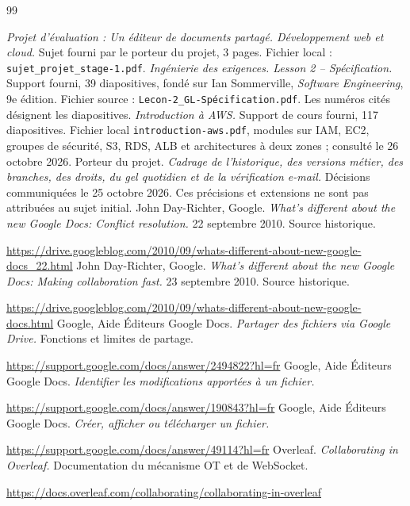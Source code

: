 \begingroup
\small
\begin{thebibliography}{99}
\setlength{\itemsep}{0pt}
\setlength{\parskip}{0pt}
 \emph{Projet d'évaluation : Un éditeur de documents partagé. Développement web et cloud.} Sujet fourni par le porteur du projet, 3 pages. Fichier local : \texttt{sujet\_projet\_stage-1.pdf}.
 \emph{Ingénierie des exigences. Lesson 2 -- Spécification.} Support fourni, 39 diapositives, fondé sur Ian Sommerville, \emph{Software Engineering}, 9e édition. Fichier source : \texttt{Lecon-2\_GL-Spécification.pdf}. Les numéros cités désignent les diapositives.
 \emph{Introduction à AWS.} Support de cours fourni, 117 diapositives. Fichier local \texttt{introduction-aws.pdf}, modules sur IAM, EC2, groupes de sécurité, S3, RDS, ALB et architectures à deux zones ; consulté le 26 octobre 2026.
 Porteur du projet. \emph{Cadrage de l'historique, des versions métier, des branches, des droits, du gel quotidien et de la vérification e-mail.} Décisions communiquées le 25 octobre 2026. Ces précisions et extensions ne sont pas attribuées au sujet initial.
 John Day-Richter, Google. \emph{What's different about the new Google Docs: Conflict resolution.} 22 septembre 2010. Source historique.\par\url{https://drive.googleblog.com/2010/09/whats-different-about-new-google-docs_22.html}
 John Day-Richter, Google. \emph{What's different about the new Google Docs: Making collaboration fast.} 23 septembre 2010. Source historique.\par\url{https://drive.googleblog.com/2010/09/whats-different-about-new-google-docs.html}
 Google, Aide Éditeurs Google Docs. \emph{Partager des fichiers via Google Drive.} Fonctions et limites de partage.\par\url{https://support.google.com/docs/answer/2494822?hl=fr}
 Google, Aide Éditeurs Google Docs. \emph{Identifier les modifications apportées à un fichier.}\par\url{https://support.google.com/docs/answer/190843?hl=fr}
 Google, Aide Éditeurs Google Docs. \emph{Créer, afficher ou télécharger un fichier.}\par\url{https://support.google.com/docs/answer/49114?hl=fr}
 Overleaf. \emph{Collaborating in Overleaf.} Documentation du mécanisme OT et de WebSocket.\par\url{https://docs.overleaf.com/collaborating/collaborating-in-overleaf}

\end{thebibliography}

